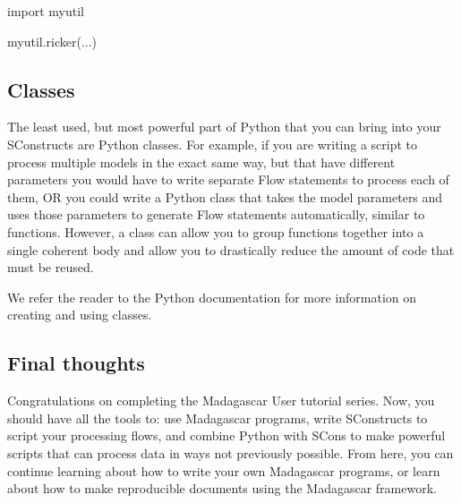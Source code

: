 \begin{verbatimtab}[4]
import myutil

myutil.ricker(...)
\end{verbatimtab}

\subsection{Classes}

The least used, but most powerful part of Python that you can bring into your SConstructs are Python classes.   For example, if you are writing a script to process multiple models in the exact same way, but that have different parameters you would have to write separate Flow statements to process each of them, OR you could write a Python class that takes the model parameters and uses those parameters to generate Flow statements automatically, similar to functions.  However, a class can allow you to group functions together into a single coherent body and allow you to drastically reduce the amount of code that must be reused.  

We refer the reader to the Python documentation for more information on creating and using classes.

\subsection{Final thoughts}

Congratulations on completing the Madagascar User tutorial series.  Now, you should have all the tools to: use Madagascar programs, write SConstructs to script your processing flows, and combine Python with SCons to make powerful scripts that can process data in ways not previously possible.  From here, you can continue learning about how to write your own Madagascar programs, or learn about how to make reproducible documents using the Madagascar framework.  



